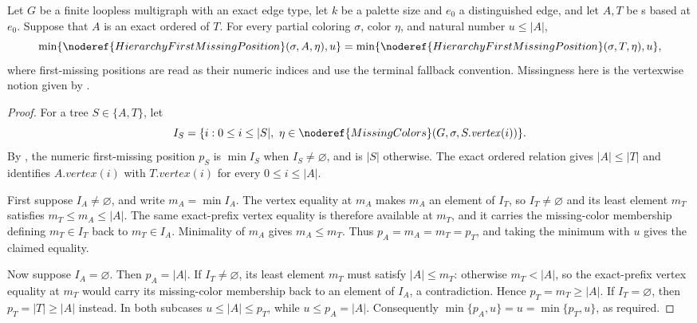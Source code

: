 \begin{lemma}
Let \(G\) be a finite loopless multigraph with an exact edge type, let
\(k\) be a palette size and \(e_0\) a distinguished edge, and let
\(A,T\) be s based at \(e_0\).  Suppose that \(A\)
is an exact ordered  of \(T\).  For
every partial coloring \(\sigma\), color \(\eta\), and natural number
\(u\leq |A|\),
\[
 \min\{\noderef{HierarchyFirstMissingPosition}(\sigma,A,\eta),u\}
 =
 \min\{\noderef{HierarchyFirstMissingPosition}(\sigma,T,\eta),u\},
\]
where first-missing positions are read as their numeric indices and use
the terminal fallback convention.  Missingness here is the vertexwise
notion given by .
\end{lemma}
\begin{proof}
For a tree \(S\in\{A,T\}\), let
\[
 I_S=\{i:0\leq i\leq |S|,
       \ \eta\in\noderef{MissingColors}(G,\sigma,S.\mathit{vertex}(i))\}.
\]
By , the numeric first-missing
position \(p_S\) is \(\min I_S\) when \(I_S\neq\varnothing\), and is
\(|S|\) otherwise.  The exact ordered
 relation gives \(|A|\leq|T|\) and
identifies \(A.\mathit{vertex}(i)\) with
\(T.\mathit{vertex}(i)\) for every \(0\leq i\leq|A|\).

First suppose \(I_A\neq\varnothing\), and write \(m_A=\min I_A\).
The vertex equality at \(m_A\) makes \(m_A\) an element of \(I_T\), so
\(I_T\neq\varnothing\) and its least element \(m_T\) satisfies
\(m_T\leq m_A\leq |A|\).  The same exact-prefix vertex equality is
therefore available at \(m_T\), and it carries the missing-color
membership defining \(m_T\in I_T\) back to \(m_T\in I_A\).  Minimality
of \(m_A\) gives \(m_A\leq m_T\).  Thus \(p_A=m_A=m_T=p_T\), and taking
the minimum with \(u\) gives the claimed equality.

Now suppose \(I_A=\varnothing\).  Then \(p_A=|A|\).  If
\(I_T\neq\varnothing\), its least element \(m_T\) must satisfy
\(|A|\leq m_T\): otherwise \(m_T<|A|\), so the exact-prefix vertex
equality at \(m_T\) would carry its missing-color membership back to an
element of \(I_A\), a contradiction.  Hence \(p_T=m_T\geq|A|\).  If
\(I_T=\varnothing\), then \(p_T=|T|\geq|A|\) instead.  In both subcases
\(u\leq|A|\leq p_T\), while \(u\leq p_A=|A|\).  Consequently
\(\min\{p_A,u\}=u=\min\{p_T,u\}\), as required.
\end{proof}
